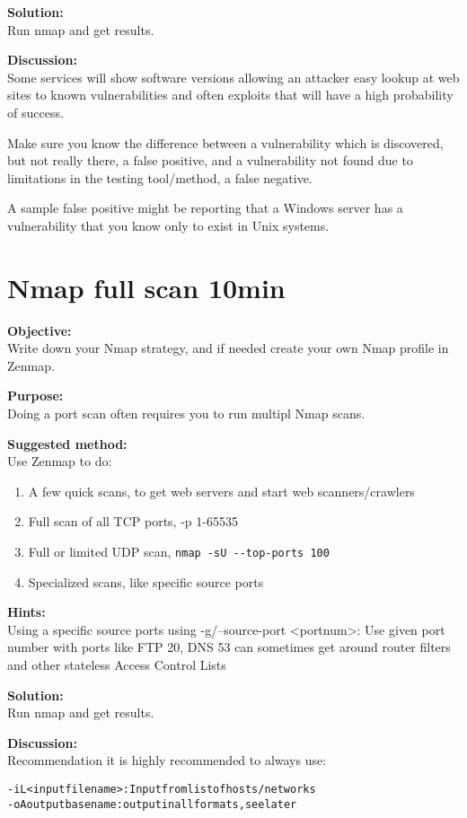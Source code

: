 \documentclass[a4paper,11pt,notitlepage]{report}
\begin{document}
{\bf Solution:}\\
Run nmap and get results.

{\bf Discussion:}\\

Some services will show software versions allowing an attacker easy lookup at web sites to known vulnerabilities and often exploits that will have a high probability of success.

Make sure you know the difference between a vulnerability which is discovered, but not really there, a false positive, and a vulnerability not found due to limitations in the testing tool/method, a false negative.

A sample false positive might be reporting that a Windows server has a vulnerability that you know only to exist in Unix systems.


\chapter{Nmap full scan 10min}
\label{ex:nmap-strategy}


{\bf Objective:} \\
Write down your Nmap strategy, and if needed create your own Nmap profile in Zenmap.


{\bf Purpose:}\\
Doing a port scan often requires you to run multipl Nmap scans.


{\bf Suggested method:}\\
Use Zenmap to do:
\begin{enumerate}
\item A few quick scans, to get web servers and start web scanners/crawlers
\item Full scan of all TCP ports, -p 1-65535
\item Full or limited UDP scan, \verb+nmap -sU --top-ports 100+
\item Specialized scans, like specific source ports
\end{enumerate}


{\bf Hints:} \\
Using a specific source ports using -g/--source-port <portnum>: Use given port number with ports like FTP 20, DNS 53 can sometimes get around router filters and other stateless Access Control Lists

{\bf Solution:}\\
Run nmap and get results.

{\bf Discussion:}\\
Recommendation it is highly recommended to always use:
\begin{alltt}
-iL <inputfilename>: Input from list of hosts/networks
-oA outputbasename: output in all formats, see later
\end{alltt}
\end{document}
